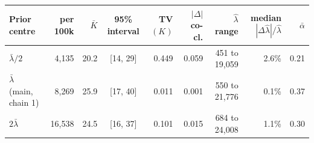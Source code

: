 \begin{tabular}{l r r c r r r r r}
\toprule
Prior centre & per 100k & $\bar K$ & 95\% interval & TV$(K)$ & $|\Delta|$ co-cl. & $\hat\lambda$ range & median $|\Delta\hat\lambda|/\hat\lambda$ & $\bar\alpha$ \\
\midrule
$\bar\lambda / 2$ & 4{,}135 & 20.2 & [14, 29] & 0.449 & 0.059 & 451 to 19{,}059 & 2.6\% & 0.21 \\
$\bar\lambda$ (main, chain 1) & 8{,}269 & 25.9 & [17, 40] & 0.011 & 0.001 & 550 to 21{,}776 & 0.1\% & 0.37 \\
$2\bar\lambda$ & 16{,}538 & 24.5 & [16, 37] & 0.101 & 0.015 & 684 to 24{,}008 & 1.1\% & 0.30 \\
\bottomrule
\end{tabular}
